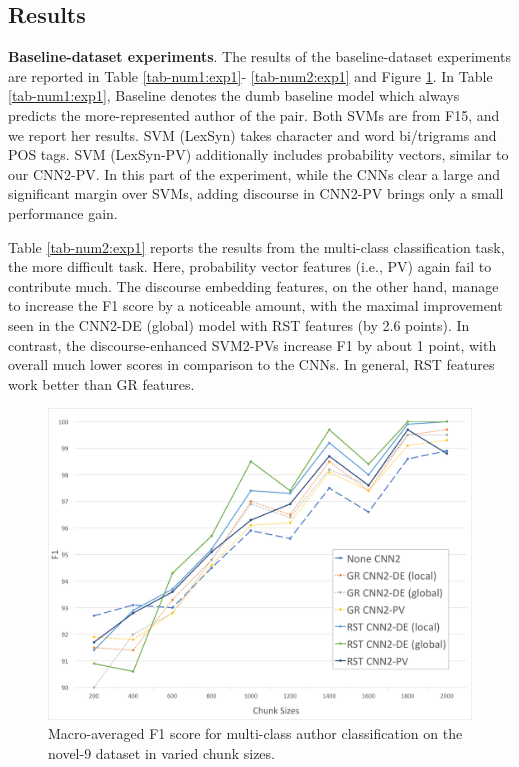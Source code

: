 \subsection{Results}
\label{subsec:results}
\textbf{Baseline-dataset experiments}.
The results of the baseline-dataset experiments are reported in Table \ref{tab-num1:exp1}- \ref{tab-num2:exp1} and Figure \ref{fig:exp1-varying-sizes}. 
In Table \ref{tab-num1:exp1}, Baseline denotes the dumb baseline model which always predicts the more-represented author of the pair. 
Both SVMs are from F15, and we report her results.
SVM (LexSyn) takes character and word bi/trigrams and POS tags. 
SVM (LexSyn-PV) additionally includes probability vectors, similar to our CNN2-PV.
In this part of the experiment, while the CNNs clear a large and significant margin over SVMs, adding discourse in CNN2-PV brings only a small performance gain.

Table \ref{tab-num2:exp1} reports the results from the multi-class classification task, the more difficult task. 
Here, probability vector features (i.e., PV) again fail to contribute much.
The discourse embedding features, on the other hand, manage to increase the F1 score by a noticeable amount, with the maximal improvement seen in the CNN2-DE (global) model with RST features (by 2.6 points).
In contrast, the discourse-enhanced SVM2-PVs increase F1 by about 1 point, with overall much lower scores in comparison to the CNNs.
In general, RST features work better than GR features.

\begin{figure}[t]
\includegraphics[scale=0.25]{plots/longer2_exp1.png}
\vspace{-1.2em}
\caption{Macro-averaged F1 score for multi-class author classification on the novel-9 dataset in varied chunk sizes.}
\label{fig:exp1-varying-sizes}
\end{figure}

